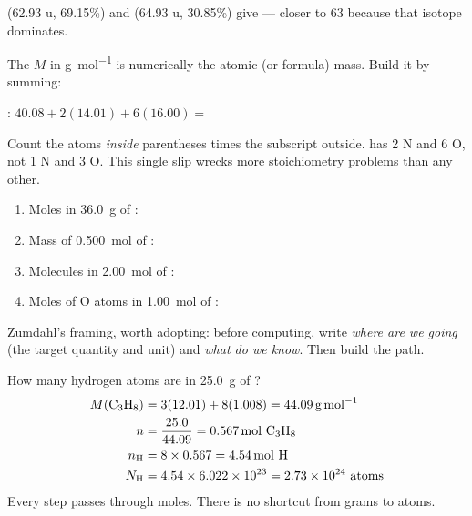 \documentclass{apchem-notes}
\begin{document}
 (62.93 u, 69.15\%) and  (64.93 u, 30.85\%) give
 --- closer to 63 because that isotope
dominates.


The  $M$ in \si{\gram\per\mole} is numerically the atomic
(or formula) mass. Build it by summing:

: $40.08 + 2(14.01) + 6(16.00) =$

\begin{apctrap}
Count the atoms \emph{inside} parentheses times the subscript outside.
 has 2 N and 6 O, not 1 N and 3 O. This single slip wrecks more
stoichiometry problems than any other.
\end{apctrap}


\begin{enumerate}[leftmargin=*,itemsep=0.35em]
  \item Moles in \SI{36.0}{\gram} of :
  \item Mass of \SI{0.500}{\mole} of :
  \item Molecules in \SI{2.00}{\mole} of :
  \item Moles of O atoms in \SI{1.00}{\mole} of :
\end{enumerate}



Zumdahl's framing, worth adopting: before computing, write
\emph{where are we going} (the target quantity and unit) and \emph{what do
we know}. Then build the path.

\begin{workedexample}
How many hydrogen atoms are in \SI{25.0}{\gram} of ?
\begin{align*}
  M(\ce{C3H8}) &= 3(12.01) + 8(1.008) = \SI{44.09}{\gram\per\mole}\\
  n &= \frac{25.0}{44.09} = \SI{0.567}{\mole}\ \ce{C3H8}\\
  n_{\ce{H}} &= 8 \times 0.567 = \SI{4.54}{\mole}\ \ce{H}\\
  N_{\ce{H}} &= 4.54 \times 6.022\times10^{23} = 2.73\times10^{24}\ \text{atoms}
\end{align*}
Every step passes through moles. There is no shortcut from grams to atoms.
\end{workedexample}
\end{document}
